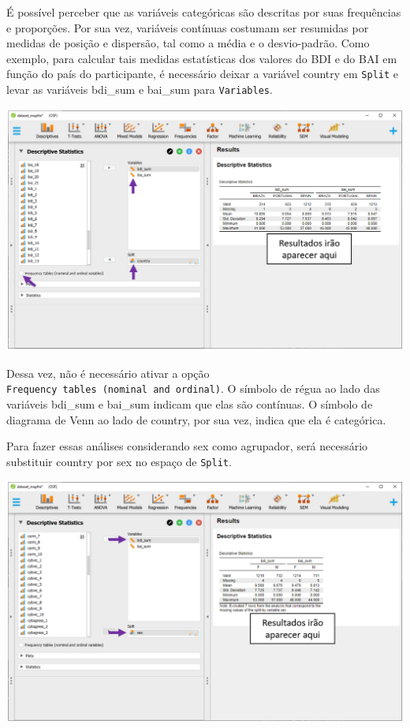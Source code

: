 \documentclass[
]{book}
\begin{document}
É possível perceber que as variáveis categóricas são descritas por suas frequências e proporções. Por sua vez, variáveis contínuas costumam ser resumidas por medidas de posição e dispersão, tal como a média e o desvio-padrão. Como exemplo, para calcular tais medidas estatísticas dos valores do BDI e do BAI em função do país do participante, é necessário deixar a variável country em \texttt{Split} e levar as variáveis bdi\_sum e bai\_sum para \texttt{Variables}.

\includegraphics{./img/cap_desc_jasp_proporcao_duas_variaveis_split2.png}

Dessa vez, não é necessário ativar a opção \texttt{Frequency\ tables\ (nominal\ and\ ordinal)}. O símbolo de régua ao lado das variáveis bdi\_sum e bai\_sum indicam que elas são contínuas. O símbolo de diagrama de Venn ao lado de country, por sua vez, indica que ela é categórica.

Para fazer essas análises considerando sex como agrupador, será necessário substituir country por sex no espaço de \texttt{Split}.

\includegraphics{./img/cap_desc_jasp_proporcao_duas_variaveis_split3.png}
\end{document}
